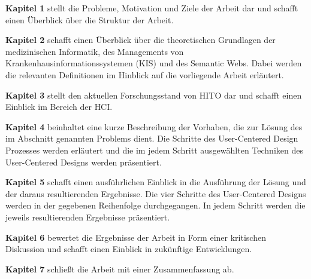 \textbf{Kapitel 1} stellt die Probleme, Motivation und Ziele der Arbeit dar und schafft einen Überblick über die Struktur der Arbeit. \newline

\textbf{Kapitel 2} schafft einen Überblick über die theoretischen Grundlagen der medizinischen Informatik, des Managements von Krankenhausinformationssystemen (KIS) und  des Semantic Webs. Dabei werden die relevanten Definitionen im Hinblick auf die vorliegende Arbeit erläutert.  \newline

\textbf{Kapitel 3} stellt den aktuellen Forschungsstand von HITO dar und schafft einen Einblick im Bereich der \ac{HCI}. \newline

\textbf{Kapitel 4} beinhaltet eine kurze Beschreibung der Vorhaben, die zur Lösung des im Abschnitt  genannten Problems dient. 
Die Schritte des User-Centered Design Prozesses werden erläutert und die im jedem Schritt ausgewählten Techniken des User-Centered Designs werden präsentiert. \newline

\textbf{Kapitel 5} schafft einen ausführlichen Einblick in die Ausführung der Lösung und der daraus resultierenden Ergebnisse. 
Die vier Schritte des User-Centered Designs werden in der gegebenen Reihenfolge durchgegangen.
In jedem Schritt werden die jeweils resultierenden Ergebnisse präsentiert. \newline

\textbf{Kapitel 6} bewertet die Ergebnisse der Arbeit in Form einer kritischen Diskussion und schafft einen Einblick in zukünftige Entwicklungen. \newline

\textbf{Kapitel 7} schließt die Arbeit mit einer Zusammenfassung ab.



